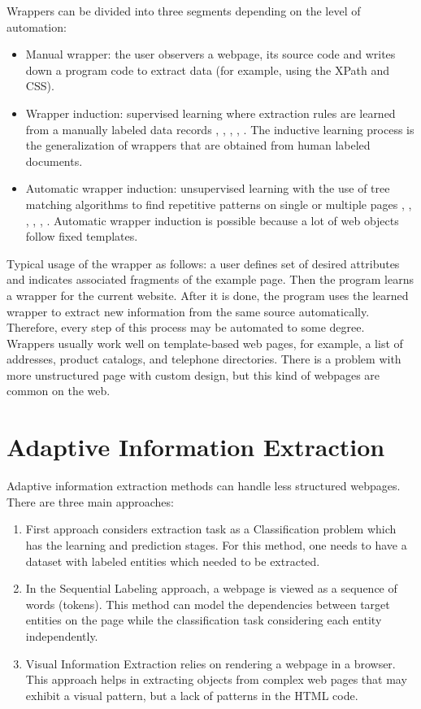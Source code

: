 \noindent Wrappers can be divided into three segments depending on the level of automation:
\begin{itemize}
    \item Manual wrapper: the user observers a webpage, its source code and writes down a program code to extract data (for example, using the XPath and CSS).
    \item Wrapper induction: supervised learning where extraction rules are learned from a manually labeled data records \cite{Hsu}, \cite{BotUp}, \cite{Stalker}, \cite{Wien}, \cite{Rapier}\cite{SRV}\cite{Vide}. The inductive learning process is the generalization of wrappers that are obtained from human labeled documents. 
    \item Automatic wrapper induction: unsupervised learning with the use of tree matching algorithms to find repetitive patterns on single or multiple pages \cite{Qiu}, \cite{Dalvi}, \cite{Diadem}, \cite{Roadrunner}, \cite{LiuMinData}, \cite{Urest}. Automatic wrapper induction is possible because a lot of web objects follow fixed templates.
\end{itemize}

Typical usage of the wrapper as follows: a user defines set of desired attributes and indicates associated fragments of the example page. Then the program learns a wrapper for the current website. After it is done, the program uses the learned wrapper to extract new information from the same source automatically. Therefore, every step of this process may be automated to some degree. \\

Wrappers usually work well on template-based web pages, for example, a list of addresses, product catalogs, and telephone directories. There is a problem with more unstructured page with custom design, but this kind of webpages are common on the web.

\section{Adaptive Information Extraction}

Adaptive information extraction methods can handle less structured webpages. There are three main approaches:

\begin{enumerate}
    \item First approach considers extraction task as a Classification problem which has the learning and prediction stages. For this method, one needs to have a dataset with labeled entities which needed to be extracted. 
    \item In the Sequential Labeling approach, a webpage is viewed as a sequence of words (tokens). This method can model the dependencies between target entities on the page while the classification task considering each entity independently.
    \item Visual Information Extraction relies on rendering a webpage in a browser. This approach helps in extracting objects from complex web pages that may exhibit a visual pattern, but a lack of patterns in the HTML code.
\end{enumerate}

